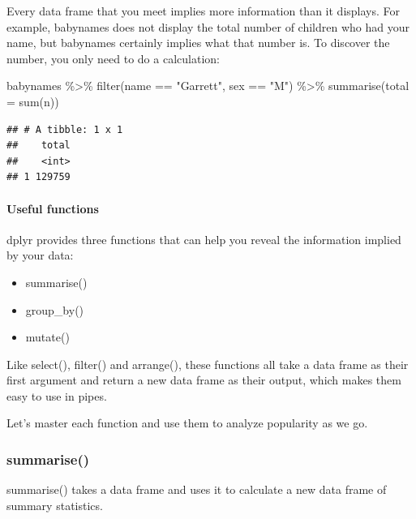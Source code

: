 \documentclass[
]{article}
\newenvironment{Shaded}{\begin{snugshade}}{\end{snugshade}}
\newcommand{\AttributeTok}[1]{\textcolor[rgb]{0.77,0.63,0.00}{#1}}
\newcommand{\FunctionTok}[1]{\textcolor[rgb]{0.00,0.00,0.00}{#1}}
\newcommand{\NormalTok}[1]{#1}
\newcommand{\SpecialCharTok}[1]{\textcolor[rgb]{0.00,0.00,0.00}{#1}}
\newcommand{\StringTok}[1]{\textcolor[rgb]{0.31,0.60,0.02}{#1}}
\providecommand{\tightlist}{%
  \setlength{\itemsep}{0pt}\setlength{\parskip}{0pt}}
\begin{document}
Every data frame that you meet implies more information than it
displays. For example, babynames does not display the total number of
children who had your name, but babynames certainly implies what that
number is. To discover the number, you only need to do a calculation:

\begin{Shaded}
\begin{Highlighting}[]
\NormalTok{babynames }\SpecialCharTok{\%\textgreater{}\%} 
  \FunctionTok{filter}\NormalTok{(name }\SpecialCharTok{==} \StringTok{"Garrett"}\NormalTok{, sex }\SpecialCharTok{==} \StringTok{"M"}\NormalTok{) }\SpecialCharTok{\%\textgreater{}\%} 
  \FunctionTok{summarise}\NormalTok{(}\AttributeTok{total =} \FunctionTok{sum}\NormalTok{(n))}
\end{Highlighting}
\end{Shaded}

\begin{verbatim}
## # A tibble: 1 x 1
##    total
##    <int>
## 1 129759
\end{verbatim}

\hypertarget{useful-functions}{%
\paragraph{Useful functions}\label{useful-functions}}

dplyr provides three functions that can help you reveal the information
implied by your data:

\begin{itemize}
\tightlist
\item
  summarise()
\item
  group\_by()
\item
  mutate()
\end{itemize}

Like select(), filter() and arrange(), these functions all take a data
frame as their first argument and return a new data frame as their
output, which makes them easy to use in pipes.

Let's master each function and use them to analyze popularity as we go.

\hypertarget{summarise}{%
\subsubsection{summarise()}\label{summarise}}

summarise() takes a data frame and uses it to calculate a new data frame
of summary statistics.
\end{document}
